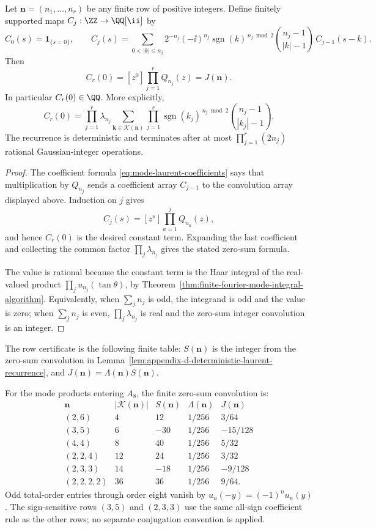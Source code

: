 \begin{lemma}%
\label{lem:appendix-d-deterministic-laurent-recurrence}
Let \(\mathbf n=(n_1,\ldots,n_r)\) be any finite row of positive integers.
Define finitely supported maps \(C_j:\ZZ\to\QQ[\ii]\) by
\[
C_0(s)=\mathbf 1_{\{s=0\}},\qquad
C_j(s)=\sum_{0<|k|\le n_j}
2^{-n_j}(-\ii)^{n_j}\operatorname{sgn}(k)^{\,n_j\bmod2}
\binom{n_j-1}{|k|-1}\,C_{j-1}(s-k).
\]
Then
\[
  C_r(0)=[z^0]\prod_{j=1}^r Q_{n_j}(z)=J(\mathbf n).
\]
In particular \(C_r(0)\in\QQ\).  More explicitly,
\[
C_r(0)=
\prod_{j=1}^r\lambda_{n_j}
\sum_{\mathbf k\in\mathcal K(\mathbf n)}
\prod_{j=1}^r
\operatorname{sgn}(k_j)^{\,n_j\bmod2}
\binom{n_j-1}{|k_j|-1}.
\]
The recurrence is deterministic and terminates after at most
\(\prod_{j=1}^r(2n_j)\) rational Gaussian-integer operations.
\end{lemma}

\begin{proof}
The coefficient formula \eqref{eq:mode-laurent-coefficients} says that
multiplication by \(Q_{n_j}\) sends a coefficient array \(C_{j-1}\) to the
convolution array displayed above.  Induction on \(j\) gives
\[
  C_j(s)=[z^s]\prod_{a=1}^jQ_{n_a}(z),
\]
and hence \(C_r(0)\) is the desired constant term.  Expanding the last
coefficient and collecting the common factor
\(\prod_j\lambda_{n_j}\) gives the stated zero-sum formula.

The value is rational because the constant term is the Haar integral of the
real-valued product
\(\prod_j u_{n_j}(\tan\theta)\), by
Theorem~\ref{thm:finite-fourier-mode-integral-algorithm}.  Equivalently,
when \(\sum_j n_j\) is odd, the integrand is odd and the value is zero; when
\(\sum_j n_j\) is even, \(\prod_j\lambda_{n_j}\) is real and the zero-sum
integer convolution is an integer.
\end{proof}

The row certificate is the following finite table: \(S(\mathbf n)\) is the
integer from the zero-sum convolution in
Lemma~\ref{lem:appendix-d-deterministic-laurent-recurrence}, and
\(J(\mathbf n)=\Lambda(\mathbf n)S(\mathbf n)\).

For the mode products entering \(A_8\), the finite zero-sum
convolution is:
\[
\begin{array}{c|r|r|c|c}
\mathbf n&|\mathcal K(\mathbf n)|&S(\mathbf n)&\Lambda(\mathbf n)&J(\mathbf n)\\
\hline
(2,6)&4&12&1/256&3/64\\
(3,5)&6&-30&1/256&-15/128\\
(4,4)&8&40&1/256&5/32\\
(2,2,4)&12&24&1/256&3/32\\
(2,3,3)&14&-18&1/256&-9/128\\
(2,2,2,2)&36&36&1/256&9/64 .
\end{array}
\]
Odd total-order entries through order eight vanish by
\(u_n(-y)=(-1)^nu_n(y)\).  The sign-sensitive rows
\((3,5)\) and \((2,3,3)\) use the same all-sign coefficient rule as the
other rows; no separate conjugation convention is applied.

